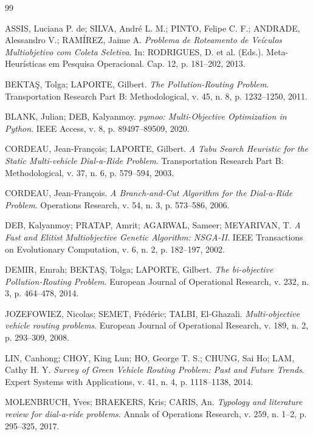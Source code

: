\documentclass[12pt,a4paper]{article}
\theoremstyle{plain}
\begin{document}
\newpage
{}
\begin{thebibliography}{99}

ASSIS, Luciana P. de; SILVA, André L. M.; PINTO, Felipe C. F.; ANDRADE, Alessandro V.; RAMÍREZ, Jaime A.
\textit{Problema de Roteamento de Veículos Multiobjetivo com Coleta Seletiva}.
In: RODRIGUES, D. et al. (Eds.). Meta-Heurísticas em Pesquisa Operacional. Cap. 12, p. 181--202, 2013.

BEKTA\c{S}, Tolga; LAPORTE, Gilbert.
\textit{The Pollution-Routing Problem}.
Transportation Research Part B: Methodological, v. 45, n. 8, p. 1232--1250, 2011.

BLANK, Julian; DEB, Kalyanmoy.
\textit{pymoo: Multi-Objective Optimization in Python}.
IEEE Access, v. 8, p. 89497--89509, 2020.

CORDEAU, Jean-Fran\c{c}ois; LAPORTE, Gilbert.
\textit{A Tabu Search Heuristic for the Static Multi-vehicle Dial-a-Ride Problem}.
Transportation Research Part B: Methodological, v. 37, n. 6, p. 579--594, 2003.

CORDEAU, Jean-Fran\c{c}ois.
\textit{A Branch-and-Cut Algorithm for the Dial-a-Ride Problem}.
Operations Research, v. 54, n. 3, p. 573--586, 2006.

DEB, Kalyanmoy; PRATAP, Amrit; AGARWAL, Sameer; MEYARIVAN, T.
\textit{A Fast and Elitist Multiobjective Genetic Algorithm: NSGA-II}.
IEEE Transactions on Evolutionary Computation, v. 6, n. 2, p. 182--197, 2002.

DEMIR, Emrah; BEKTA\c{S}, Tolga; LAPORTE, Gilbert.
\textit{The bi-objective Pollution-Routing Problem}.
European Journal of Operational Research, v. 232, n. 3, p. 464--478, 2014.

JOZEFOWIEZ, Nicolas; SEMET, Fr\'ed\'eric; TALBI, El-Ghazali.
\textit{Multi-objective vehicle routing problems}.
European Journal of Operational Research, v. 189, n. 2, p. 293--309, 2008.

LIN, Canhong; CHOY, King Lun; HO, George T. S.; CHUNG, Sai Ho; LAM, Cathy H. Y.
\textit{Survey of Green Vehicle Routing Problem: Past and Future Trends}.
Expert Systems with Applications, v. 41, n. 4, p. 1118--1138, 2014.

MOLENBRUCH, Yves; BRAEKERS, Kris; CARIS, An.
\textit{Typology and literature review for dial-a-ride problems}.
Annals of Operations Research, v. 259, n. 1--2, p. 295--325, 2017.


\end{thebibliography}
\end{document}
